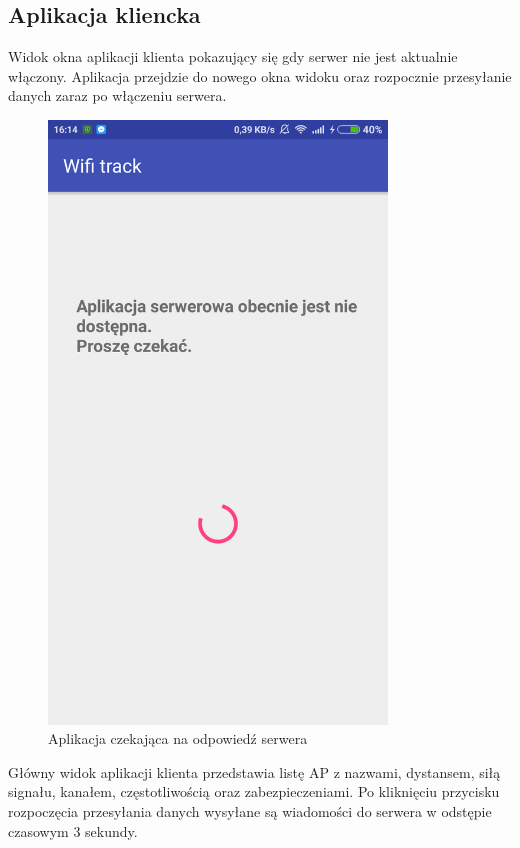 \documentclass{article}
\begin{document}
\subsection{Aplikacja kliencka}
Widok okna aplikacji klienta pokazujący się gdy serwer nie jest aktualnie włączony. Aplikacja przejdzie do nowego okna widoku oraz rozpocznie przesyłanie danych zaraz po włączeniu serwera.
\begin{figure}[H]
	\centering
	\includegraphics[width=9cm]{apkW8.png}
	\caption{Aplikacja czekająca na odpowiedź serwera}
	\label{fig:rysowanie.jpg}

\end{figure}
\newpage
Główny widok aplikacji klienta przedstawia listę AP z nazwami, dystansem, siłą signału, kanałem, częstotliwością oraz zabezpieczeniami. Po kliknięciu przycisku rozpoczęcia przesyłania danych wysyłane są wiadomości do serwera w odstępie czasowym 3 sekundy.
\end{document}
